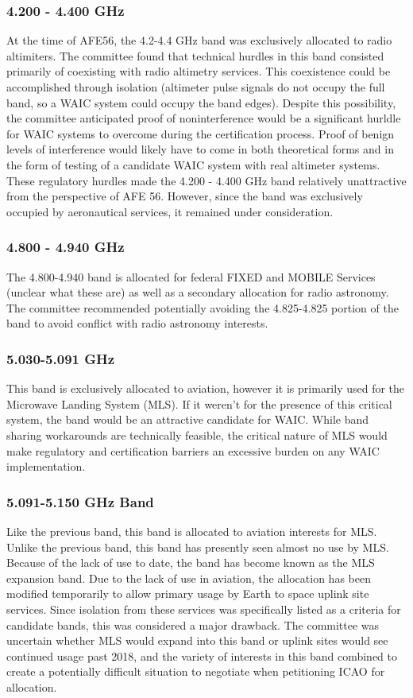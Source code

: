\subsubsection{4.200 - 4.400 GHz}
At the time of AFE56, the 4.2-4.4 GHz band was exclusively allocated to radio altimiters. The committee found that technical hurdles in this band consisted primarily of coexisting with radio altimetry services. This coexistence could be accomplished through isolation (altimeter pulse signals do not occupy the full band, so a WAIC system could occupy the band edges). Despite this possibility, the committee anticipated proof of noninterference would be a significant hurldle for WAIC systems to overcome during the certification process. Proof of benign levels of interference would likely have to come in both theoretical forms and in the form of testing of a candidate WAIC system with real altimeter systems. These regulatory hurdles made the 4.200 - 4.400 GHz band relatively unattractive from the perspective of AFE 56. However, since the band was exclusively occupied by aeronautical services, it remained under consideration. 

\subsubsection {4.800 - 4.940 GHz}
The 4.800-4.940 band is allocated for federal FIXED and MOBILE Services (unclear what these are) as well as  a secondary allocation for radio astronomy. The committee recommended potentially avoiding the 4.825-4.825 portion of the band to avoid conflict with radio astronomy interests. 

\subsubsection{5.030-5.091 GHz}
This band is exclusively allocated to aviation, however it is primarily used for the Microwave Landing System (MLS). If it weren't for the presence of this critical system, the band would be an attractive candidate for WAIC. While band sharing workarounds are technically feasible, the critical nature of MLS would make regulatory and certification barriers an excessive burden on any WAIC implementation. 

\subsubsection{5.091-5.150 GHz Band} 
Like the previous band, this band is allocated to aviation interests for MLS. Unlike the previous band, this band has presently seen almost no use by MLS. Because of the lack  of use to date, the band has become known as the MLS expansion band. Due to the lack of use in aviation, the allocation has been modified temporarily to allow primary usage by Earth to space uplink site services. Since isolation from these services was specifically listed as a criteria for candidate bands, this was considered a major drawback. The committee was uncertain whether MLS would expand into this band or uplink sites would see continued usage past 2018, and the variety of interests in this band combined to create a potentially difficult situation to negotiate when petitioning ICAO for allocation. 


